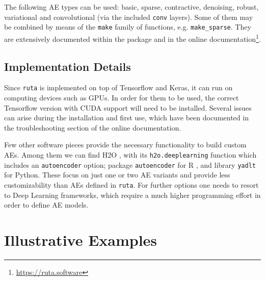 \documentclass[
	fontsize=11pt, %
	twoside=false, %
	open=any, %
	secnumdepth=1, %
]{kaobook}
\newcommand{\revised}[1]{#1}
\begin{document}
The following AE types can be used: basic, sparse, contractive, denoising, robust, variational \revised{and convolutional (via the included \texttt{conv} layers)}. Some of them may be combined by means of the \texttt{make} family of functions, e.g. \texttt{make\_sparse}. They are extensively documented within the package and in the online documentation\footnote{\url{https://ruta.software}}.


\subsection{Implementation Details}
\label{sec.implementation}

Since \texttt{ruta} is implemented on top of Tensorflow and Keras, it can run on computing devices such as GPUs. In order for them to be used, the correct Tensorflow version with CUDA support will need to be installed. Several issues can arise during the installation and first use, which have been documented in the troubleshooting section of the online documentation.

Few other software pieces provide the necessary functionality to build custom AEs. Among them we can find H2O \cite{h2o}, with its \texttt{h2o.deeplearning} function which includes an \texttt{autoencoder} option; package \texttt{autoencoder} for R \cite{Rautoencoder}, and library \texttt{yadlt} for Python. These focus on just one or two AE variants and provide less customizability than AEs defined in \texttt{ruta}. For further options one needs to resort to Deep Learning frameworks, which require a much higher programming effort in order to define AE models.


\section{Illustrative Examples}
\label{sec.examples}

\end{document}
